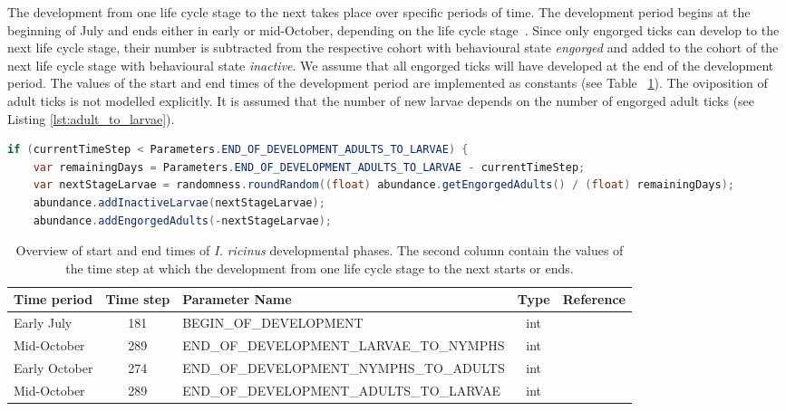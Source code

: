 \documentclass[a4paper, 11pt]{scrartcl}
\begin{document}
The development from one life cycle stage to the next takes place over specific periods of time. The development period begins at the beginning of July and ends either in early or mid-October, depending on the life cycle stage~\parencite{tba}. Since only engorged ticks can develop to the next life cycle stage, their number is subtracted from the respective cohort with behavioural state \emph{engorged} and added to the cohort of the next life cycle stage with behavioural state \emph{inactive}. We assume that all engorged ticks will have developed at the end of the development period. The values of the start and end times of the development period are implemented as constants (see Table ~\ref{tab:development_parameters}). The oviposition of adult ticks is not modelled explicitly. It is assumed that the number of new larvae depends on the number of engorged adult ticks (see Listing \ref{lst:adult_to_larvae}).

\begin{lstlisting}[language = Java, caption = {Calculation of new larvae based on the number of engorged adults}]
if (currentTimeStep < Parameters.END_OF_DEVELOPMENT_ADULTS_TO_LARVAE) {
	var remainingDays = Parameters.END_OF_DEVELOPMENT_ADULTS_TO_LARVAE - currentTimeStep;
	var nextStageLarvae = randomness.roundRandom((float) abundance.getEngorgedAdults() / (float) remainingDays);
	abundance.addInactiveLarvae(nextStageLarvae);
	abundance.addEngorgedAdults(-nextStageLarvae);
\end{lstlisting}
\label{lst:adult_to_larvae}

\begin{table}[h!]
\caption[Overview of start and end times of \emph{I. ricinus} developmental phases.]{Overview of start and end times of \emph{I. ricinus} developmental phases. The second column contain the values of the time step at which the development from one life cycle stage to the next starts or ends.}
\label{tab:development_parameters}
\begin{tabularx}{\textwidth}{lclcl}
\toprule
\textbf{Time period} 	& \textbf{Time step} & \textbf{Parameter Name}							& \textbf{Type}    & \textbf{Reference} \\
\midrule
Early July   			& 181   			 & \tiny{BEGIN\_OF\_DEVELOPMENT}					& int      & \cite{Kahl}   		\\
Mid-October     		& 289      			 & \tiny{END\_OF\_DEVELOPMENT\_LARVAE\_TO\_NYMPHS}	& int      & \cite{Kahl}      	\\
Early October    		& 274    			 & \tiny{END\_OF\_DEVELOPMENT\_NYMPHS\_TO\_ADULTS}	& int      & \cite{Kahl}     	\\
Mid-October     		& 289      			 & \tiny{END\_OF\_DEVELOPMENT\_ADULTS\_TO\_LARVAE}	& int      & \cite{Kahl}			\\
\bottomrule
\end{tabularx}
\end{table}
\end{document}
